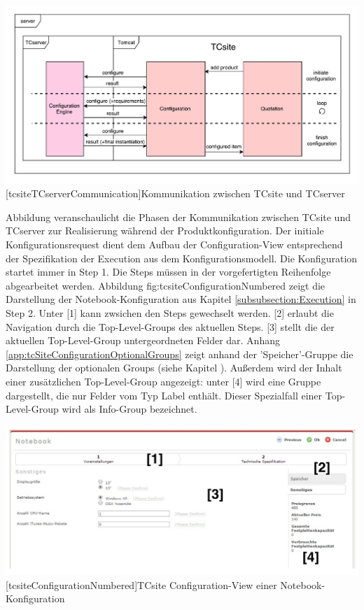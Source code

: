 \documentclass[12pt,a4paper,bibliography=totocnumbered,listof=totoc]{scrartcl}
\begin{document}
\vspace{1em}
\begin{minipage}{\linewidth}
	\centering
	\includegraphics[width=1\linewidth]{Abbildungen/tcsiteTCserverCommunication.pdf}
	[tcsiteTCserverCommunication]{Kommunikation zwischen TCsite und TCserver}
	\label{fig:tcsiteTCserverCommunication}
\end{minipage}
\vspace{1em}

Abbildung \label{fig:tcsiteTCserverCommunication} veranschaulicht die Phasen der Kommunikation zwischen TCsite und TCserver zur Realisierung während der Produktkonfiguration. Der initiale Konfigurationsrequest dient dem Aufbau der Configuration-View entsprechend der Spezifikation der Execution aus dem Konfigurationsmodell. Die Konfiguration startet immer in Step 1. Die Steps müssen in der vorgefertigten Reihenfolge abgearbeitet werden. Abbildung {fig:tcsiteConfigurationNumbered} zeigt die Darstellung der Notebook-Konfiguration aus Kapitel \ref{subsubsection:Execution} in Step 2. Unter [1] kann zwsichen den Steps gewechselt werden. [2] erlaubt die Navigation durch die Top-Level-Groups des aktuellen Steps. [3] stellt die der aktuellen Top-Level-Group untergeordneten Felder dar. Anhang \ref{app:tcSiteConfigurationOptionalGroups} zeigt anhand der 'Speicher'-Gruppe die Darstellung der optionalen Groups (siehe Kapitel \label{subsubsection:Execution}). Außerdem wird der Inhalt einer zusätzlichen Top-Level-Group angezeigt: unter [4] wird eine Gruppe dargestellt, die nur Felder vom Typ Label enthält. Dieser Spezialfall einer Top-Level-Group wird als Info-Group bezeichnet.

\vspace{1em}
\begin{minipage}{\linewidth}
	\centering
	\includegraphics[width=0.8\linewidth]{Abbildungen/tcsiteConfigurationNumbered.pdf}
	[tcsiteConfigurationNumbered]{TCsite Configuration-View einer Notebook-Konfiguration}
	\label{fig:tcsiteConfigurationNumbered}
\end{minipage}
\vspace{1em}
\end{document}
